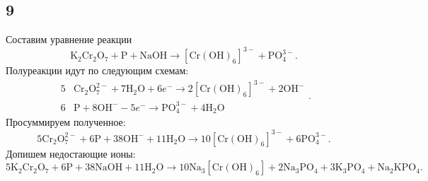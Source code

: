 \subsection{9}

Составим уравнение реакции
\[
\mathrm{K_2Cr_2O_7}+\mathrm{P}+\mathrm{NaOH}\longrightarrow\mathrm{[Cr(OH)_6]^{3-}}+\mathrm{PO_4^{3-}}.
\]
Полуреакции идут по следующим схемам:
\[
\begin{array}{r|l}
	5 & \mathrm{Cr_2O_7^{2-}}+7\mathrm{H_2O}+6e^-\longrightarrow2\mathrm{[Cr(OH)_6]^{3-}}+2\mathrm{OH^{-}} \\
	6 & \mathrm{P}+8\mathrm{OH^-}-5e^-\longrightarrow\mathrm{PO_4^{3-}}+4\mathrm{H_2O}
\end{array}.
\]
Просуммируем полученное:
\[
5\mathrm{Cr_2O_7^{2-}}+6\mathrm{P}+38\mathrm{OH^-}+11\mathrm{H_2O}\longrightarrow10\mathrm{[Cr(OH)_6]^{3-}}+6\mathrm{PO_4^{3-}}.
\]
Допишем недостающие ионы:
\[
5\mathrm{K_2Cr_2O_7}+6\mathrm{P}+38\mathrm{NaOH}+11\mathrm{H_2O}\longrightarrow10\mathrm{Na_3[Cr(OH)_6]}+2\mathrm{Na_3PO_4}+3\mathrm{K_3PO_4}+\mathrm{Na_2KPO_4}.
\]